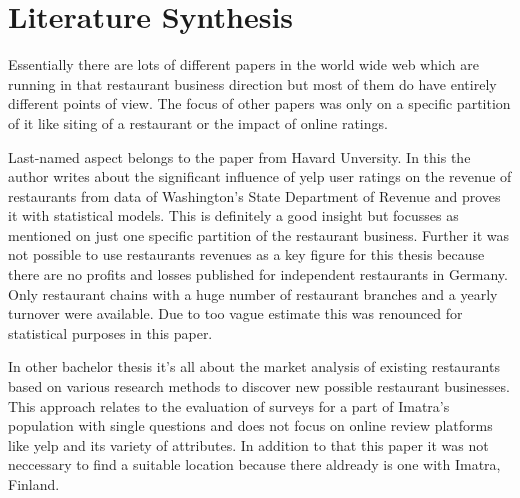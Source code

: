 \section{Literature Synthesis}
\label{sec:synthesis}
Essentially there are lots of different papers in the world wide web which are running in that restaurant business direction but most of them do have entirely different points of view. The focus of other papers was only on a specific partition of it like siting of a restaurant or the impact of online ratings. 

Last-named aspect belongs to the paper from Havard Unversity\cite{CaseOfYelp}. In this the author writes about the significant influence of yelp user ratings on the revenue of restaurants from data of Washington’s State Department of Revenue and proves it with statistical models. This is definitely a good insight but focusses as mentioned on just one specific partition of the restaurant business. Further it was not possible to use restaurants revenues as a key figure for this thesis because there are no profits and losses published for independent restaurants in Germany. Only restaurant chains with a huge number of restaurant branches and a yearly turnover were available. Due to too vague estimate this was renounced for statistical purposes in this paper.

In other bachelor thesis \cite{Imatra} it's all about the market analysis of existing restaurants based on various research methods to discover new possible restaurant businesses. This approach relates to the evaluation of surveys for a part of Imatra's population with single questions and does not focus on online review platforms like yelp and its variety of attributes. In addition to that this paper it was not neccessary to find a suitable location because there aldready is one with Imatra, Finland.